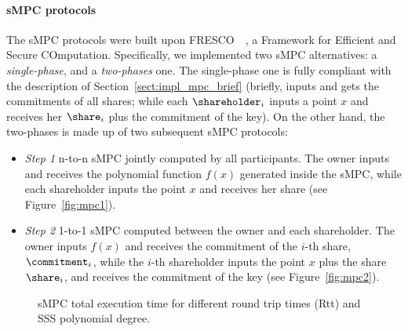\medskip

\paragraph*{sMPC protocols}
The sMPC protocols were built upon FRESCO~\cite{FRESCO-git}~\cite{damgaard2016mpc}, a Framework for Efficient and Secure COmputation. Specifically, we implemented two sMPC alternatives: a {\em single-phase}, and a {\em two-phases} one. 
The single-phase one is fully compliant with the description of Section~\ref{sect:impl_mpc_brief} (briefly, \owner inputs \key and gets the commitments of all shares; while each $\shareholder_{i}$ inputs a point $x$ and receives her $\share_{i}$ plus the commitment of the key). 
On the other hand, the two-phases is made up of two subsequent sMPC protocols:
\begin{itemize}
	\item {\em Step 1} n-to-n sMPC jointly computed by all participants. The owner inputs \key and receives the polynomial function $f\left( x \right)$ generated inside the sMPC, while each shareholder inputs the point $x$ and receives her share (see Figure~\ref{fig:mpc1}). 
	\item {\em Step 2} 1-to-1 sMPC computed between the owner and each shareholder. The owner inputs $f\left( x \right)$ and receives the commitment of the $i$-th share, $\commitment_i$, while the $i$-th shareholder inputs the point $x$ plus the share $\share_{i}$, and receives the commitment of the key (see Figure~\ref{fig:mpc2}).
\end{itemize}


\begin{figure}[t]
	\centering
	\hfill
	\hfill
	\caption{sMPC total execution time for different round trip times (Rtt) and SSS polynomial degree.}
	\label{fig:timertt}
\end{figure}


